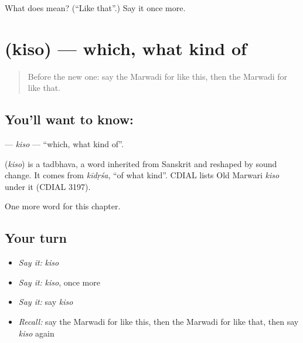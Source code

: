 \begin{tcolorbox}[breakable,colback=teal!4,colframe=teal!35!black,title={Before you move on}]
What does  mean? (\textquotedblleft{}Like that\textquotedblright{}.) Say it once more.
\end{tcolorbox}
\section[\texorpdfstring{\mw{किसो} (kiso)}{किसो (kiso)}]{ (kiso) — which, what kind of}

\label{lesson:MW-C101-kiso}



\begin{quote}
Before the new one: say the Marwadi for like this, then the Marwadi for like that.
\end{quote}

\subsection*{You'll want to know: }
\textbf{} — \emph{kiso} — \textquotedblleft{}which, what kind of\textquotedblright{}.

\begin{cousinweb}
\textbf{} (\emph{kiso}) is a tadbhava, a word inherited from Sanskrit and reshaped by sound change. It comes from \emph{kīdṛśa}, \textquotedblleft{}of what kind\textquotedblright{}. CDIAL lists Old Marwari \emph{kiso} under it (CDIAL 3197).
\end{cousinweb}

\begin{grammarlens}[title={What you've built}]
One more word for this chapter.
\end{grammarlens}

\subsection*{Your turn}
\begin{itemize}
\raggedright
  \item \emph{Say it:} \emph{kiso}
  \item \emph{Say it:} \emph{kiso}, once more
  \item \emph{Say it:} say \emph{kiso}
  \item \emph{Recall:} say the Marwadi for like this, then the Marwadi for like that, then say \emph{kiso} again
\end{itemize}

